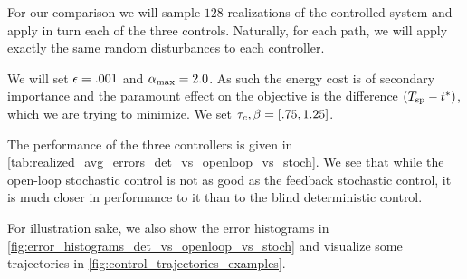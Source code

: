 \documentclass{article}
\begin{document}
For our comparison we will sample $128$ realizations of the controlled system
and apply in turn each of the three controls. Naturally, for each path, we will
apply exactly the same random disturbances to each controller.

We will set ${\epsilon} = .001$ and ${ {\alpha}_{\textrm{max}} } = 2.0$. As such the energy cost is of
secondary importance and the paramount effect on the objective is the difference
$({ T_{\textrm{sp} } } - { t^* })$, which we are trying to minimize. We set ${ \tau_{c} }, {\beta} = [.75, 1.25]$.

The performance of the three controllers is given in
\cref{tab:realized_avg_errors_det_vs_openloop_vs_stoch}. We see that while the
open-loop stochastic control is not as good as the feedback stochastic
control, it is much closer in performance to it than to the blind
deterministic control.

For illustration sake, we also show the error
histograms in \cref{fig:error_histograms_det_vs_openloop_vs_stoch} and visualize
some trajectories in \cref{fig:control_trajectories_examples}.
\end{document}
